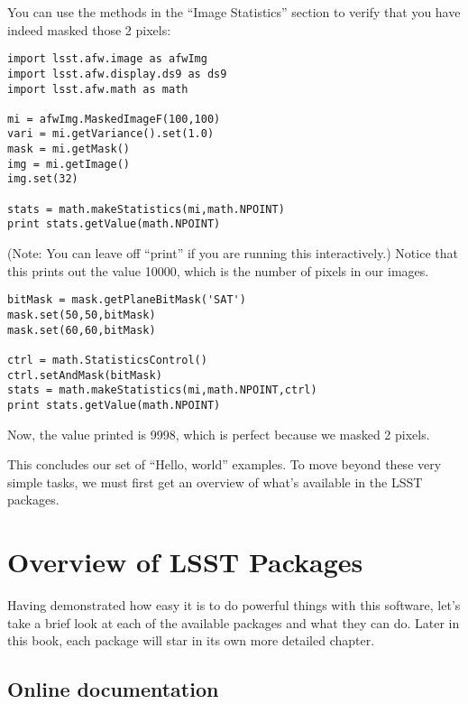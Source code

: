 \documentclass{book}
\begin{document}
You can use the methods in the ``Image Statistics'' section to verify that you have indeed masked those 2 pixels:

\begin{verbatim}
import lsst.afw.image as afwImg
import lsst.afw.display.ds9 as ds9
import lsst.afw.math as math

mi = afwImg.MaskedImageF(100,100)
vari = mi.getVariance().set(1.0)
mask = mi.getMask()
img = mi.getImage()
img.set(32)

stats = math.makeStatistics(mi,math.NPOINT)
print stats.getValue(math.NPOINT)
\end{verbatim}

(Note: You can leave off ``print'' if you are running this interactively.)  Notice that this prints out the value 10000, which is the number of pixels in our images.

\begin{verbatim}
bitMask = mask.getPlaneBitMask('SAT')
mask.set(50,50,bitMask)
mask.set(60,60,bitMask)

ctrl = math.StatisticsControl()
ctrl.setAndMask(bitMask)
stats = math.makeStatistics(mi,math.NPOINT,ctrl)
print stats.getValue(math.NPOINT)
\end{verbatim}

Now, the value printed is 9998, which is perfect because we masked 2 pixels.



\vskip0.5in

This concludes our set of ``Hello, world'' examples.  To move beyond
these very simple tasks, we must first get an overview of what's
available in the LSST packages.

\chapter{Overview of LSST Packages\label{chap-overview}}

Having demonstrated how easy it is to do powerful things with this
software, let's take a brief look at each of the available packages
and what they can do.  Later in this book, each package will star in
its own more detailed chapter.

\section{Online documentation}
\end{document}
